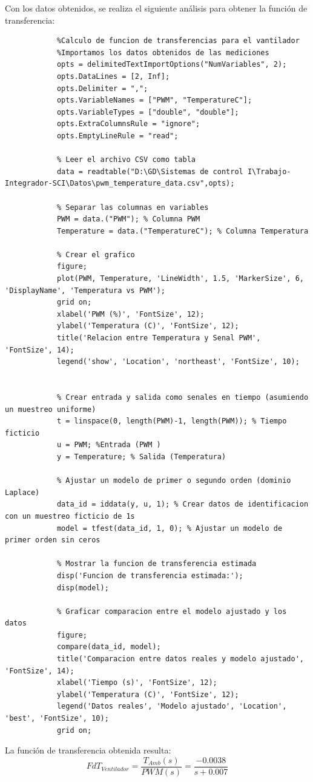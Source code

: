 \documentclass[12pt]{article}
\begin{document}
		Con los datos obtenidos, se realiza el siguiente análisis para obtener la función de transferencia:
		
		\begin{lstlisting}
			%Calculo de funcion de transferencias para el vantilador
			%Importamos los datos obtenidos de las mediciones
			opts = delimitedTextImportOptions("NumVariables", 2);
			opts.DataLines = [2, Inf];
			opts.Delimiter = ",";
			opts.VariableNames = ["PWM", "TemperatureC"];
			opts.VariableTypes = ["double", "double"];
			opts.ExtraColumnsRule = "ignore";
			opts.EmptyLineRule = "read";
			
			% Leer el archivo CSV como tabla
			data = readtable("D:\GD\Sistemas de control I\Trabajo-Integrador-SCI\Datos\pwm_temperature_data.csv",opts);
			
			% Separar las columnas en variables
			PWM = data.("PWM"); % Columna PWM
			Temperature = data.("TemperatureC"); % Columna Temperatura
			
			% Crear el grafico
			figure;
			plot(PWM, Temperature, 'LineWidth', 1.5, 'MarkerSize', 6, 'DisplayName', 'Temperatura vs PWM');
			grid on;
			xlabel('PWM (%)', 'FontSize', 12);
			ylabel('Temperatura (C)', 'FontSize', 12);
			title('Relacion entre Temperatura y Senal PWM', 'FontSize', 14);
			legend('show', 'Location', 'northeast', 'FontSize', 10);
			
			
			% Crear entrada y salida como senales en tiempo (asumiendo un muestreo uniforme)
			t = linspace(0, length(PWM)-1, length(PWM)); % Tiempo ficticio
			u = PWM; %Entrada (PWM )
			y = Temperature; % Salida (Temperatura)
			
			% Ajustar un modelo de primer o segundo orden (dominio Laplace)
			data_id = iddata(y, u, 1); % Crear datos de identificacion con un muestreo ficticio de 1s
			model = tfest(data_id, 1, 0); % Ajustar un modelo de primer orden sin ceros
			
			% Mostrar la funcion de transferencia estimada
			disp('Funcion de transferencia estimada:');
			disp(model);
			
			% Graficar comparacion entre el modelo ajustado y los datos
			figure;
			compare(data_id, model);
			title('Comparacion entre datos reales y modelo ajustado', 'FontSize', 14);
			xlabel('Tiempo (s)', 'FontSize', 12);
			ylabel('Temperatura (C)', 'FontSize', 12);
			legend('Datos reales', 'Modelo ajustado', 'Location', 'best', 'FontSize', 10);
			grid on;
		\end{lstlisting}
		
		La función de transferencia obtenida resulta:
		\begin{equation}
			FdT_{Ventilador}=\frac{T_{Amb}(s)}{PWM(s)}=\frac{-0.0038}{s+0.007}
		\end{equation}
		
\end{document}
